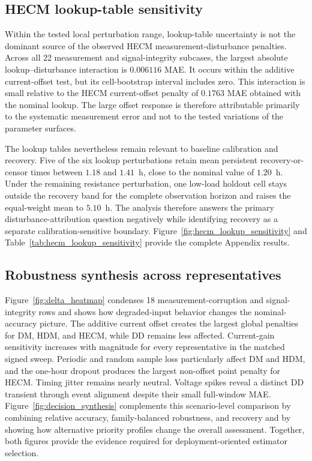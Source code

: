 \documentclass[review,nopreprintline]{elsarticle}
\begin{document}
\subsection{HECM lookup-table sensitivity}
Within the tested local perturbation range, lookup-table uncertainty is not the dominant source of the observed HECM measurement-disturbance penalties. Across all 22 measurement and signal-integrity subcases, the largest absolute lookup--disturbance interaction is $0.006116$ MAE. It occurs within the additive current-offset test, but its cell-bootstrap interval includes zero. This interaction is small relative to the HECM current-offset penalty of $0.1763$ MAE obtained with the nominal lookup. The large offset response is therefore attributable primarily to the systematic measurement error and not to the tested variations of the parameter surfaces.

The lookup tables nevertheless remain relevant to baseline calibration and recovery. Five of the six lookup perturbations retain mean persistent recovery-or-censor times between $1.18$ and $1.41$~h, close to the nominal value of $1.20$~h. Under the remaining resistance perturbation, one low-load holdout cell stays outside the recovery band for the complete observation horizon and raises the equal-weight mean to $5.10$~h. The analysis therefore answers the primary disturbance-attribution question negatively while identifying recovery as a separate calibration-sensitive boundary. Figure~\ref{fig:hecm_lookup_sensitivity} and Table~\ref{tab:hecm_lookup_sensitivity} provide the complete Appendix results.

\subsection{Robustness synthesis across representatives}
Figure~\ref{fig:delta_heatmap} condenses 18 measurement-corruption and signal-integrity rows and shows how degraded-input behavior changes the nominal-accuracy picture. The additive current offset creates the largest global penalties for DM, HDM, and HECM, while DD remains less affected. Current-gain sensitivity increases with magnitude for every representative in the matched signed sweep. Periodic and random sample loss particularly affect DM and HDM, and the one-hour dropout produces the largest non-offset point penalty for HECM. Timing jitter remains nearly neutral. Voltage spikes reveal a distinct DD transient through event alignment despite their small full-window MAE. Figure~\ref{fig:decision_synthesis} complements this scenario-level comparison by combining relative accuracy, family-balanced robustness, and recovery and by showing how alternative priority profiles change the overall assessment. Together, both figures provide the evidence required for deployment-oriented estimator selection.
\end{document}

